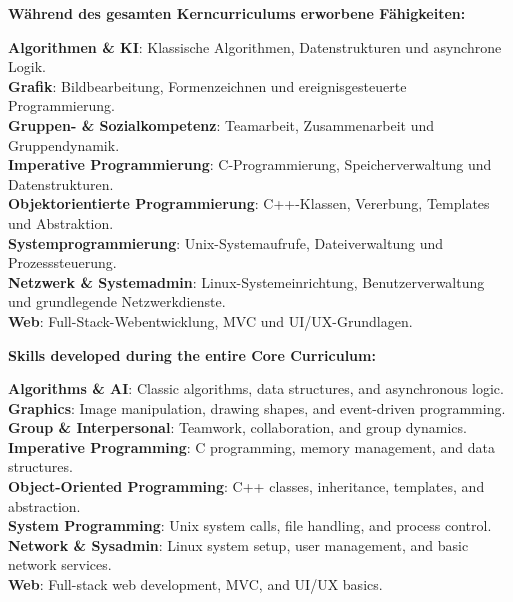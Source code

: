 \documentclass[11pt]{article}
\begin{document}
{{{{{{{{{{\vspace{0.5em}

{%
\noindent\textbf{Während des gesamten Kerncurriculums erworbene Fähigkeiten:}
\vspace{1.0em}

\noindent \textbf{Algorithmen \& KI}: Klassische Algorithmen, Datenstrukturen und asynchrone Logik.\\
\noindent \textbf{Grafik}: Bildbearbeitung, Formenzeichnen und ereignisgesteuerte Programmierung.\\
\noindent \textbf{Gruppen- \& Sozialkompetenz}: Teamarbeit, Zusammenarbeit und Gruppendynamik.\\
\noindent \textbf{Imperative Programmierung}: C-Programmierung, Speicherverwaltung und Datenstrukturen.\\
\noindent \textbf{Objektorientierte Programmierung}: C++-Klassen, Vererbung, Templates und Abstraktion.\\
\noindent \textbf{Systemprogrammierung}: Unix-Systemaufrufe, Dateiverwaltung und Prozesssteuerung.\\
\noindent \textbf{Netzwerk \& Systemadmin}: Linux-Systemeinrichtung, Benutzerverwaltung und grundlegende Netzwerkdienste.\\
\noindent \textbf{Web}: Full-Stack-Webentwicklung, MVC und UI/UX-Grundlagen.\\
{%
\noindent\textbf{Skills developed during the entire Core Curriculum:}
\vspace{1.0em}

\noindent \textbf{Algorithms \& AI}: Classic algorithms, data structures, and asynchronous logic.\\
\noindent \textbf{Graphics}: Image manipulation, drawing shapes, and event-driven programming.\\
\noindent \textbf{Group \& Interpersonal}: Teamwork, collaboration, and group dynamics.\\
\noindent \textbf{Imperative Programming}: C programming, memory management, and data structures.\\
\noindent \textbf{Object-Oriented Programming}: C++ classes, inheritance, templates, and abstraction.\\
\noindent \textbf{System Programming}: Unix system calls, file handling, and process control.\\
\noindent \textbf{Network \& Sysadmin}: Linux system setup, user management, and basic network services.\\
\noindent \textbf{Web}: Full-stack web development, MVC, and UI/UX basics.\\
{%

}}}}}}}}}}}}}
\end{document}
